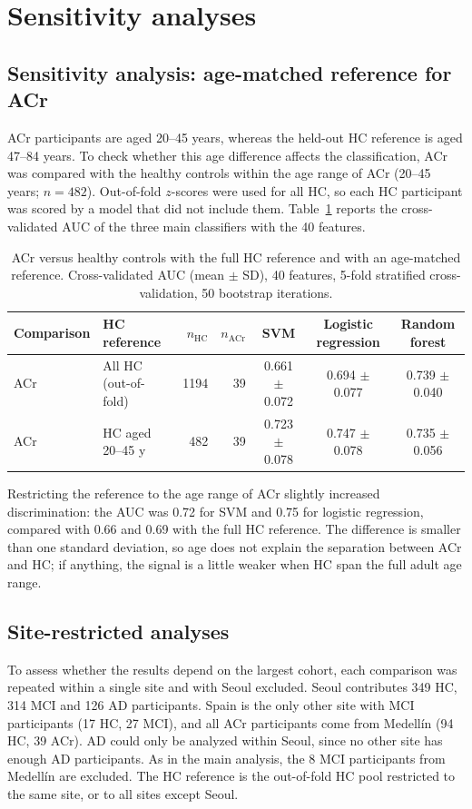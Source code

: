 \documentclass[11pt]{article}
\begin{document}
\section{Sensitivity analyses}

\subsection{Sensitivity analysis: age-matched reference for ACr}
ACr participants are aged 20--45 years, whereas the held-out HC reference is aged 47--84 years. To check whether this age difference affects the classification, ACr was compared with the healthy controls within the age range of ACr (20--45 years; $n=482$). Out-of-fold $z$-scores were used for all HC, so each HC participant was scored by a model that did not include them. Table~\ref{tab:age_matched} reports the cross-validated AUC of the three main classifiers with the 40 features.

\begin{table}[ht]
\centering
\caption{ACr versus healthy controls with the full HC reference and with an age-matched reference. Cross-validated AUC (mean $\pm$ SD), 40 features, 5-fold stratified cross-validation, 50 bootstrap iterations.}
\label{tab:age_matched}
\small
\begin{tabular}{@{}llrrccc@{}}
\toprule
Comparison & HC reference & $n_\text{HC}$ & $n_\text{ACr}$ & SVM & Logistic regression & Random forest \\
\midrule
ACr & All HC (out-of-fold) & 1194 & 39 & 0.661 $\pm$ 0.072 & 0.694 $\pm$ 0.077 & 0.739 $\pm$ 0.040 \\
ACr & HC aged 20--45 y & 482 & 39 & 0.723 $\pm$ 0.078 & 0.747 $\pm$ 0.078 & 0.735 $\pm$ 0.056 \\
\bottomrule
\end{tabular}
\end{table}

Restricting the reference to the age range of ACr slightly increased discrimination: the AUC was 0.72 for SVM and 0.75 for logistic regression, compared with 0.66 and 0.69 with the full HC reference. The difference is smaller than one standard deviation, so age does not explain the separation between ACr and HC; if anything, the signal is a little weaker when HC span the full adult age range.

\subsection{Site-restricted analyses}
To assess whether the results depend on the largest cohort, each comparison was repeated within a single site and with Seoul excluded. Seoul contributes 349 HC, 314 MCI and 126 AD participants. Spain is the only other site with MCI participants (17 HC, 27 MCI), and all ACr participants come from Medell\'in (94 HC, 39 ACr). AD could only be analyzed within Seoul, since no other site has enough AD participants. As in the main analysis, the 8 MCI participants from Medell\'in are excluded. The HC reference is the out-of-fold HC pool restricted to the same site, or to all sites except Seoul.
\end{document}
